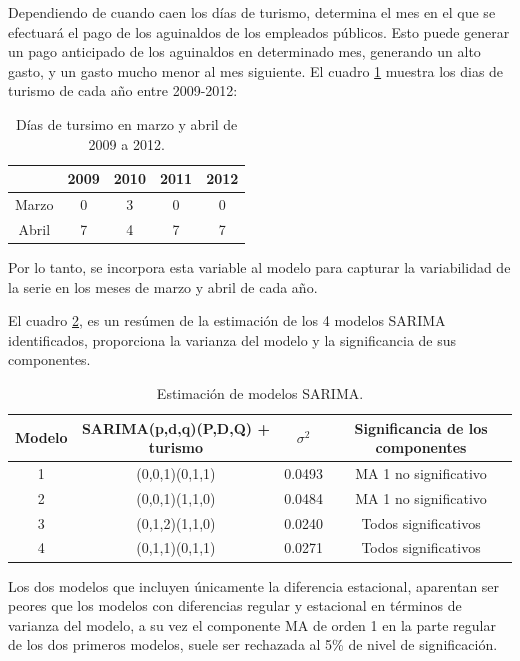 \documentclass[
  12pt,
]{article}
\begin{document}
Dependiendo de cuando caen los días de turismo, determina el mes en el
que se efectuará el pago de los aguinaldos de los empleados públicos.
Esto puede generar un pago anticipado de los aguinaldos en determinado
mes, generando un alto gasto, y un gasto mucho menor al mes siguiente.
El cuadro \ref{tab:turismo} muestra los dias de turismo de cada año
entre 2009-2012:

\begin{table}[H]
\centering
\begin{tabular}{c c c c c}
\hline
 & 2009 & 2010 & 2011 & 2012 \\ \hline
Marzo & 0 & 3 & 0 & 0 \\ 
Abril & 7 & 4 & 7 & 7 \\ \hline
\end{tabular}
\caption{Días de tursimo en marzo y abril de 2009 a 2012.}
\label{tab:turismo}
\end{table}

Por lo tanto, se incorpora esta variable al modelo para capturar la
variabilidad de la serie en los meses de marzo y abril de cada año.

El cuadro \ref{tab:models}, es un resúmen de la estimación de los 4
modelos SARIMA identificados, proporciona la varianza del modelo y la
significancia de sus componentes.

\begin{table}[H]
\centering
\begin{tabular}{c c c c}
\hline
Modelo & SARIMA(p,d,q)(P,D,Q) + turismo & $\sigma^2$ & Significancia de los componentes \\ \hline
1 & (0,0,1)(0,1,1) & 0.0493 & MA 1 no significativo \\ 
2 & (0,0,1)(1,1,0) & 0.0484 & MA 1 no significativo \\ 
3 & (0,1,2)(1,1,0) & 0.0240 & Todos significativos \\ 
4 & (0,1,1)(0,1,1) & 0.0271 & Todos significativos \\ \hline
\end{tabular}
\caption{Estimación de modelos SARIMA.}
\label{tab:models}
\end{table}

Los dos modelos que incluyen únicamente la diferencia estacional,
aparentan ser peores que los modelos con diferencias regular y
estacional en términos de varianza del modelo, a su vez el componente MA
de orden 1 en la parte regular de los dos primeros modelos, suele ser
rechazada al 5\% de nivel de significación.
\end{document}
